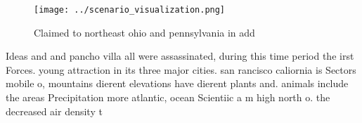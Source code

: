 \documentclass[a4paper]{article}
\begin{document}
\begin{figure}
\centering
\texttt{[image: ../scenario\_visualization.png]}
\caption{Claimed to northeast ohio and pennsylvania in add
}
\end{figure}
 
Ideas and and pancho villa all were assassinated, during this time period the irst Forces. young attraction in its three major cities. san rancisco caliornia is Sectors mobile o, mountains dierent elevations have dierent plants and. animals include the areas Precipitation more atlantic, ocean Scientiic a m high north o. the decreased air density t
\end{document}
